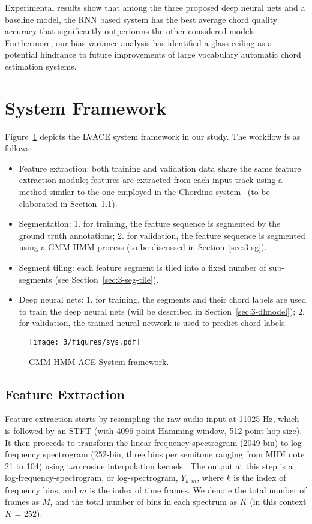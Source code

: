Experimental results show that among the three proposed deep neural nets and a baseline model, the RNN based system has the best average chord quality accuracy that significantly outperforms the other considered models. Furthermore, our bias-variance analysis has identified a glass ceiling as a potential hindrance to future improvements of large vocabulary automatic chord estimation systems.


\section{System Framework} \label{sec:3-sysframe}

Figure~\ref{fig:3-sysover} depicts the LVACE system framework in our study. The workflow is as follows:
\begin{itemize}
	\item Feature extraction: both training and validation data share the same feature extraction module; features are extracted from each input track using a method similar to the one employed in the Chordino system~\cite{mauch2010automatic} (to be elaborated in Section~\ref{sec:3-fe}).
	\item Segmentation: 1. for training, the feature sequence is segmented by the ground truth annotations; 2. for validation, the feature sequence is segmented using a GMM-HMM process (to be discussed in Section~\ref{sec:3-sg}).
	\item Segment tiling: each feature segment is tiled into a fixed number of sub-segments (see Section~\ref{sec:3-seg-tile}).
	\item Deep neural nets: 1. for training, the segments and their chord labels are used to train the deep neural nets (will be described in Section~\ref{sec:3-dlmodel}); 2. for validation, the trained neural network is used to predict chord labels.
\end{itemize}

\begin{figure}
\centering
\texttt{[image: 3/figures/sys.pdf]}
\caption{GMM-HMM ACE System framework.}
\label{fig:3-sysover}
\end{figure}

\subsection{Feature Extraction} \label{sec:3-fe}
Feature extraction starts by resampling the raw audio input at 11025 Hz, which is followed by an STFT (with 4096-point Hamming window, 512-point hop size). It then proceeds to transform the linear-frequency spectrogram (2049-bin) to log-frequency spectrogram (252-bin, three bins per semitone ranging from MIDI note 21 to 104) using two cosine interpolation kernels \cite{mauch2010automatic}. The output at this step is a log-frequency-spectrogram, or log-spectrogram, $Y_{k,m}$, where $k$ is the index of frequency bins, and $m$ is the index of time frames. We denote the total number of frames as $M$, and the total number of bins in each spectrum as $K$ (in this context $K$ = 252).

